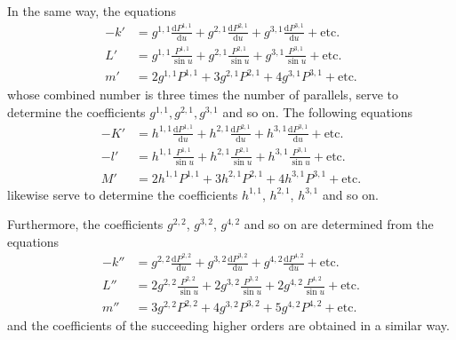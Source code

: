 In the same way, the equations
\[
\begin{aligned}
-k'&=g^{1,1}\frac{\mathrm{d}P^{1,1}}{\mathrm{d}u}+g^{2,1}\frac{\mathrm{d}P^{2,1}}{\mathrm{d}u}+g^{3,1}\frac{\mathrm{d}P^{3,1}}{\mathrm{d}u}+\text{etc.}\\
L'&=g^{1,1}\frac{P^{1,1}}{\sin u}+g^{2,1}\frac{P^{2,1}}{\sin u}+g^{3,1}\frac{P^{3,1}}{\sin u}+\text{etc.}\\
m'&=2g^{1,1}P^{1,1}+3g^{2,1}P^{2,1}+4g^{3,1}P^{3,1}+\text{etc.}
\end{aligned}
\]
whose combined number is three times the number of parallels, serve to determine the coefficients $g^{1,1},g^{2,1},g^{3,1}$ and so on. The following equations
\[
\begin{aligned}
-K'&=h^{1,1}\frac{\mathrm{d}P^{1,1}}{\mathrm{d}u}+h^{2,1}\frac{\mathrm{d}P^{2,1}}{\mathrm{d}u}+h^{3,1}\frac{\mathrm{d}P^{3,1}}{\mathrm{d}u}+\text{etc.}\\
-l'&=h^{1,1}\frac{P^{1,1}}{\sin u}+h^{2,1}\frac{P^{2,1}}{\sin u}+h^{3,1}\frac{P^{3,1}}{\sin u}+\text{etc.}\\
M'&=2h^{1,1}P^{1,1}+3h^{2,1}P^{2,1}+4h^{3,1}P^{3,1}+\text{etc.}
\end{aligned}
\]
likewise serve to determine the coefficients $h^{1,1}$, $h^{2,1}$, $h^{3,1}$ and so on.

Furthermore, the coefficients $g^{2,2}$, $g^{3,2}$, $g^{4,2}$ and so on are determined from the equations
\[
\begin{aligned}
-k''&=g^{2,2}\frac{\mathrm{d}P^{2,2}}{\mathrm{d}u}+g^{3,2}\frac{\mathrm{d}P^{3,2}}{\mathrm{d}u}+g^{4,2}\frac{\mathrm{d}P^{4,2}}{\mathrm{d}u}+\text{etc.}\\
L''&=2g^{2,2}\frac{P^{2,2}}{\sin u}+2g^{3,2}\frac{P^{3,2}}{\sin u}+2g^{4,2}\frac{P^{4,2}}{\sin u}+\text{etc.}\\
m''&=3g^{2,2}P^{2,2}+4g^{3,2}P^{3,2}+5g^{4,2}P^{4,2}+\text{etc.}
\end{aligned}
\]
and the coefficients of the succeeding higher orders are obtained in a similar way.

